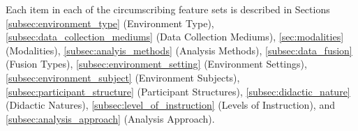 \documentclass[manuscript,screen,review]{acmart}
\begin{document}
% 
        


Each item in each of the circumscribing feature sets is described in Sections \ref{subsec:environment_type} (Environment Type), \ref{subsec:data_collection_mediums} (Data Collection Mediums), \ref{sec:modalities} (Modalities), \ref{subsec:analyis_methods} (Analysis Methods), \ref{subsec:data_fusion} (Fusion Types), \ref{subsec:environment_setting} (Environment Settings), \ref{subsec:environment_subject} (Environment Subjects), \ref{subsec:participant_structure} (Participant Structures), \ref{subsec:didactic_nature} (Didactic Natures), \ref{subsec:level_of_instruction} (Levels of Instruction), and \ref{subsec:analysis_approach} (Analysis Approach).
\end{document}
